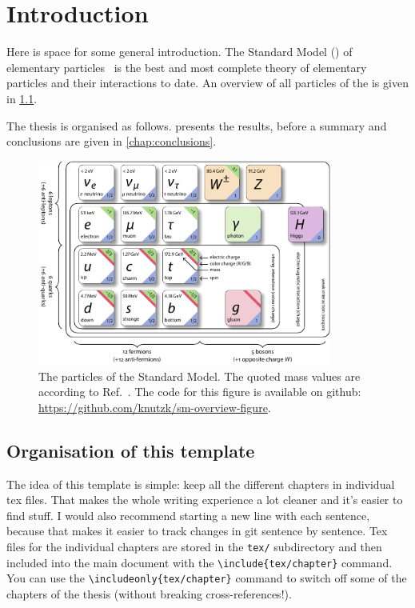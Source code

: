 \chapter{Introduction}
\label{sec:theory}

Here is space for some general introduction.
The Standard Model (\SM) of elementary particles~%
\cite{Glashow:1961tr,Weinberg:1967tq,Salam:1968rm,Glashow:1970gm,Georgi:1972cj,Gross:1973id,Politzer:1973fx,tHooft:1971akt,tHooft:1971qjg,tHooft:1972tcz,tHooft:1972qbu}
is the best and most complete theory of elementary particles and their interactions to date.
An overview of all particles of the \SM is given in \cref{fig:sm-overview}.

The thesis is organised as follows.
 presents the results, before a summary and conclusions are given in \cref{chap:conclusions}.

\begin{figure}
  \centering
  \includegraphics[width=0.86\textwidth]{figures/sm-overview}
  \caption[Particles of the Standard Model]{%
    The particles of the Standard Model.
    The quoted mass values are according to Ref.~\cite{PhysRevD.98.030001}.
    The code for this figure is available on github: \url{https://github.com/knutzk/sm-overview-figure}.
  }
  \label{fig:sm-overview}
\end{figure}


\section{Organisation of this template}

The idea of this template is simple: keep all the different chapters in individual tex files.
That makes the whole writing experience a lot cleaner and it's easier to find stuff.
I would also recommend starting a new line with each sentence, because that makes it easier to track changes in git sentence by sentence.
Tex files for the individual chapters are stored in the \texttt{tex/} subdirectory and then included into the main document with the \texttt{\textbackslash include\{tex/chapter\}} command.
You can use the \texttt{\textbackslash includeonly\{tex/chapter\}} command to switch off some of the chapters of the thesis (without breaking cross-references!).

